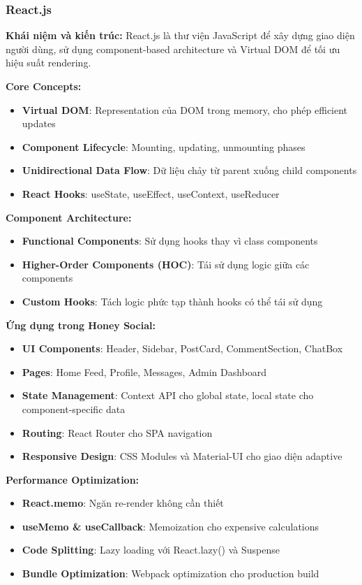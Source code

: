 \subsubsection{React.js}
\textbf{Khái niệm và kiến trúc:}
React.js là thư viện JavaScript để xây dựng giao diện người dùng, sử dụng component-based architecture và Virtual DOM để tối ưu hiệu suất rendering.

\textbf{Core Concepts:}
\begin{itemize}
\item \textbf{Virtual DOM}: Representation của DOM trong memory, cho phép efficient updates
\item \textbf{Component Lifecycle}: Mounting, updating, unmounting phases
\item \textbf{Unidirectional Data Flow}: Dữ liệu chảy từ parent xuống child components
\item \textbf{React Hooks}: useState, useEffect, useContext, useReducer
\end{itemize}

\textbf{Component Architecture:}
\begin{itemize}
\item \textbf{Functional Components}: Sử dụng hooks thay vì class components
\item \textbf{Higher-Order Components (HOC)}: Tái sử dụng logic giữa các components
\item \textbf{Custom Hooks}: Tách logic phức tạp thành hooks có thể tái sử dụng
\end{itemize}

\textbf{Ứng dụng trong Honey Social:}
\begin{itemize}
\item \textbf{UI Components}: Header, Sidebar, PostCard, CommentSection, ChatBox
\item \textbf{Pages}: Home Feed, Profile, Messages, Admin Dashboard
\item \textbf{State Management}: Context API cho global state, local state cho component-specific data
\item \textbf{Routing}: React Router cho SPA navigation
\item \textbf{Responsive Design}: CSS Modules và Material-UI cho giao diện adaptive
\end{itemize}

\textbf{Performance Optimization:}
\begin{itemize}
\item \textbf{React.memo}: Ngăn re-render không cần thiết
\item \textbf{useMemo \& useCallback}: Memoization cho expensive calculations
\item \textbf{Code Splitting}: Lazy loading với React.lazy() và Suspense
\item \textbf{Bundle Optimization}: Webpack optimization cho production build
\end{itemize}

